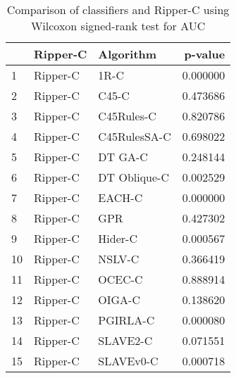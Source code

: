 \begin{table}
\footnotesize
\caption{Comparison of classifiers and Ripper-C using Wilcoxon signed-rank test for AUC}
\label{tab:Ripper-C wilcoxon AUC comparison}
\begin{tabular}{lllr}
\hline
 & Ripper-C & Algorithm & p-value \\
\hline
1 & Ripper-C & 1R-C & 0.000000 \\
2 & Ripper-C & C45-C & 0.473686 \\
3 & Ripper-C & C45Rules-C & 0.820786 \\
4 & Ripper-C & C45RulesSA-C & 0.698022 \\
5 & Ripper-C & DT GA-C & 0.248144 \\
6 & Ripper-C & DT Oblique-C & 0.002529 \\
7 & Ripper-C & EACH-C & 0.000000 \\
8 & Ripper-C & GPR & 0.427302 \\
9 & Ripper-C & Hider-C & 0.000567 \\
10 & Ripper-C & NSLV-C & 0.366419 \\
11 & Ripper-C & OCEC-C & 0.888914 \\
12 & Ripper-C & OIGA-C & 0.138620 \\
13 & Ripper-C & PGIRLA-C & 0.000080 \\
14 & Ripper-C & SLAVE2-C & 0.071551 \\
15 & Ripper-C & SLAVEv0-C & 0.000718 \\
\hline
\end{tabular}
\end{table}
